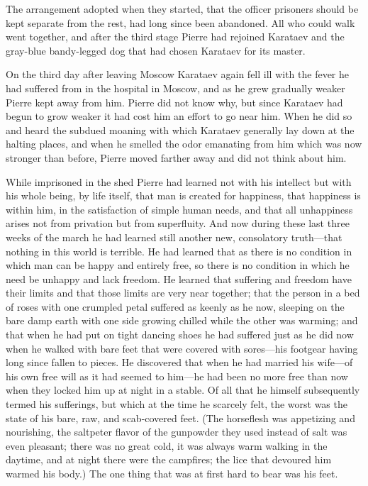 The arrangement adopted when they started, that the officer
prisoners should be kept separate from the rest, had long since
been abandoned.  All who could walk went together, and after the
third stage Pierre had rejoined Karataev and the gray-blue
bandy-legged dog that had chosen Karataev for its master.

On the third day after leaving Moscow Karataev again fell ill
with the fever he had suffered from in the hospital in Moscow,
and as he grew gradually weaker Pierre kept away from him. Pierre
did not know why, but since Karataev had begun to grow weaker it
had cost him an effort to go near him. When he did so and heard
the subdued moaning with which Karataev generally lay down at the
halting places, and when he smelled the odor emanating from him
which was now stronger than before, Pierre moved farther away and
did not think about him.

While imprisoned in the shed Pierre had learned not with his
intellect but with his whole being, by life itself, that man is
created for happiness, that happiness is within him, in the
satisfaction of simple human needs, and that all unhappiness
arises not from privation but from superfluity. And now during
these last three weeks of the march he had learned still another
new, consolatory truth---that nothing in this world is
terrible. He had learned that as there is no condition in which
man can be happy and entirely free, so there is no condition in
which he need be unhappy and lack freedom. He learned that
suffering and freedom have their limits and that those limits are
very near together; that the person in a bed of roses with one
crumpled petal suffered as keenly as he now, sleeping on the bare
damp earth with one side growing chilled while the other was
warming; and that when he had put on tight dancing shoes he had
suffered just as he did now when he walked with bare feet that
were covered with sores---his footgear having long since fallen
to pieces. He discovered that when he had married his wife---of
his own free will as it had seemed to him---he had been no more
free than now when they locked him up at night in a stable. Of
all that he himself subsequently termed his sufferings, but which
at the time he scarcely felt, the worst was the state of his
bare, raw, and scab-covered feet.  (The horseflesh was appetizing
and nourishing, the saltpeter flavor of the gunpowder they used
instead of salt was even pleasant; there was no great cold, it
was always warm walking in the daytime, and at night there were
the campfires; the lice that devoured him warmed his body.)  The
one thing that was at first hard to bear was his feet.

